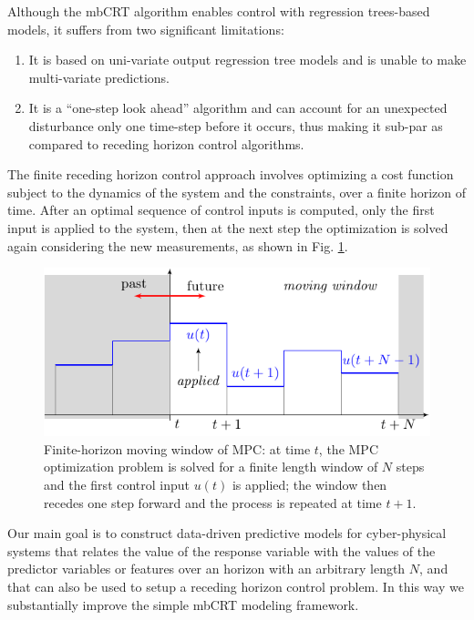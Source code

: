 
Although the mbCRT algorithm enables control with regression trees-based models, it suffers from two significant limitations:
\begin{enumerate}[leftmargin=0.5cm]
	\item It is based on uni-variate output regression tree models and is unable to make multi-variate predictions. 
	\item It is a ``one-step look ahead'' algorithm and can account for an unexpected disturbance only one time-step before it occurs, thus making it sub-par as compared to receding horizon control algorithms.
\end{enumerate}
The finite receding horizon control approach involves optimizing a cost function subject to the dynamics of the system and the constraints, over a finite horizon of time. 
After an optimal sequence of control inputs is computed, only the first input is applied to the system, then at the next step the optimization is solved again considering the new measurements, as shown in Fig. \ref{F:MPC-illust}.
\begin{figure}
	\centering
	\includegraphics[scale=0.85]{Figures/receding_horizon.pdf}
	\caption{Finite-horizon moving window of MPC: at time $t$, the MPC optimization problem is solved for a finite length window of $N$ steps and the first control input $u(t)$ is applied; the window then recedes one step forward and the process is repeated at time $t+1$.}
	\captionsetup{justification=centering}
	\label{F:MPC-illust}
\end{figure} 
Our main goal is to construct data-driven predictive models for cyber-physical systems that relates the value of the response variable with the values of the predictor variables or features over an horizon with an arbitrary length $N$, and that can also be used to setup a receding horizon control problem. 
In this way we substantially improve the simple mbCRT modeling framework.

